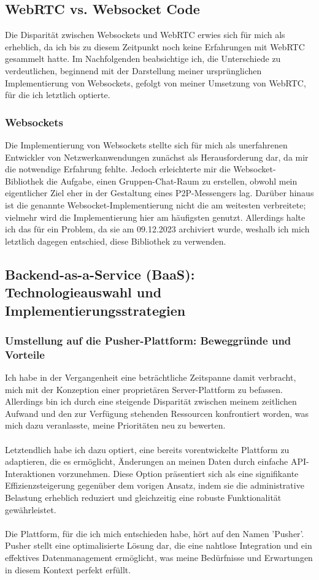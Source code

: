 \subsection{WebRTC vs. Websocket Code}
Die Disparität zwischen Websockets und WebRTC erwies sich für mich als erheblich, da ich bis zu diesem Zeitpunkt noch keine Erfahrungen mit WebRTC gesammelt hatte. Im Nachfolgenden beabsichtige ich, die Unterschiede zu verdeutlichen, beginnend mit der Darstellung meiner ursprünglichen Implementierung von Websockets, gefolgt von meiner Umsetzung von WebRTC, für die ich letztlich optierte.
\subsubsection{Websockets}
Die Implementierung von Websockets stellte sich für mich als unerfahrenen Entwickler von Netzwerkanwendungen zunächst als Herausforderung dar, da mir die notwendige Erfahrung fehlte. Jedoch erleichterte mir die Websocket-Bibliothek \cite{websocket-lib-nhooyr} die Aufgabe, einen Gruppen-Chat-Raum zu erstellen, obwohl mein eigentlicher Ziel eher in der Gestaltung eines P2P-Messengers lag. Darüber hinaus ist die genannte Websocket-Implementierung nicht die am weitesten verbreitete; vielmehr wird die Implementierung hier \cite{websocket-lib-gorrila} am häufigsten genutzt. Allerdings halte ich das für ein Problem, da sie am 09.12.2023 archiviert wurde, weshalb ich mich letztlich dagegen entschied, diese Bibliothek zu verwenden.
\subsection{Backend-as-a-Service (BaaS): Technologieauswahl und Implementierungsstrategien}
\subsubsection{Umstellung auf die Pusher-Plattform: Beweggründe und Vorteile}
Ich habe in der Vergangenheit eine beträchtliche Zeitspanne damit verbracht, mich mit der Konzeption einer proprietären Server-Plattform zu befassen. Allerdings bin ich durch eine steigende Disparität zwischen meinem zeitlichen Aufwand und den zur Verfügung stehenden Ressourcen konfrontiert worden, was mich dazu veranlasste, meine Prioritäten neu zu bewerten. \\\\
Letztendlich habe ich dazu optiert, eine bereits vorentwickelte Plattform zu adaptieren, die es ermöglicht, Änderungen an meinen Daten durch einfache API-Interaktionen vorzunehmen. Diese Option präsentiert sich als eine signifikante Effizienzsteigerung gegenüber dem vorigen Ansatz, indem sie die administrative Belastung erheblich reduziert und gleichzeitig eine robuste Funktionalität gewährleistet. \\\\
Die Plattform, für die ich mich entschieden habe, hört auf den Namen 'Pusher'. Pusher stellt eine optimalisierte Lösung dar, die eine nahtlose Integration und ein effektives Datenmanagement ermöglicht, was meine Bedürfnisse und Erwartungen in diesem Kontext perfekt erfüllt.

